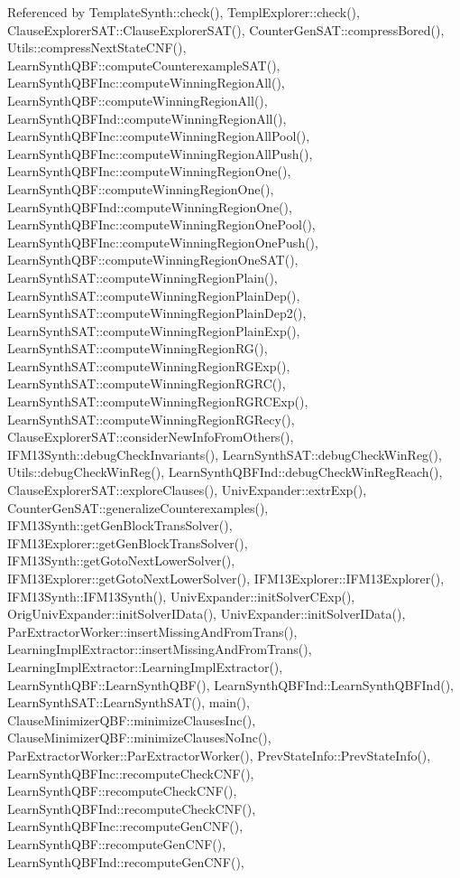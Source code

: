 Referenced by Template\-Synth\-::check(), Templ\-Explorer\-::check(), Clause\-Explorer\-S\-A\-T\-::\-Clause\-Explorer\-S\-A\-T(), Counter\-Gen\-S\-A\-T\-::compress\-Bored(), Utils\-::compress\-Next\-State\-C\-N\-F(), Learn\-Synth\-Q\-B\-F\-::compute\-Counterexample\-S\-A\-T(), Learn\-Synth\-Q\-B\-F\-Inc\-::compute\-Winning\-Region\-All(), Learn\-Synth\-Q\-B\-F\-::compute\-Winning\-Region\-All(), Learn\-Synth\-Q\-B\-F\-Ind\-::compute\-Winning\-Region\-All(), Learn\-Synth\-Q\-B\-F\-Inc\-::compute\-Winning\-Region\-All\-Pool(), Learn\-Synth\-Q\-B\-F\-Inc\-::compute\-Winning\-Region\-All\-Push(), Learn\-Synth\-Q\-B\-F\-Inc\-::compute\-Winning\-Region\-One(), Learn\-Synth\-Q\-B\-F\-::compute\-Winning\-Region\-One(), Learn\-Synth\-Q\-B\-F\-Ind\-::compute\-Winning\-Region\-One(), Learn\-Synth\-Q\-B\-F\-Inc\-::compute\-Winning\-Region\-One\-Pool(), Learn\-Synth\-Q\-B\-F\-Inc\-::compute\-Winning\-Region\-One\-Push(), Learn\-Synth\-Q\-B\-F\-::compute\-Winning\-Region\-One\-S\-A\-T(), Learn\-Synth\-S\-A\-T\-::compute\-Winning\-Region\-Plain(), Learn\-Synth\-S\-A\-T\-::compute\-Winning\-Region\-Plain\-Dep(), Learn\-Synth\-S\-A\-T\-::compute\-Winning\-Region\-Plain\-Dep2(), Learn\-Synth\-S\-A\-T\-::compute\-Winning\-Region\-Plain\-Exp(), Learn\-Synth\-S\-A\-T\-::compute\-Winning\-Region\-R\-G(), Learn\-Synth\-S\-A\-T\-::compute\-Winning\-Region\-R\-G\-Exp(), Learn\-Synth\-S\-A\-T\-::compute\-Winning\-Region\-R\-G\-R\-C(), Learn\-Synth\-S\-A\-T\-::compute\-Winning\-Region\-R\-G\-R\-C\-Exp(), Learn\-Synth\-S\-A\-T\-::compute\-Winning\-Region\-R\-G\-Recy(), Clause\-Explorer\-S\-A\-T\-::consider\-New\-Info\-From\-Others(), I\-F\-M13\-Synth\-::debug\-Check\-Invariants(), Learn\-Synth\-S\-A\-T\-::debug\-Check\-Win\-Reg(), Utils\-::debug\-Check\-Win\-Reg(), Learn\-Synth\-Q\-B\-F\-Ind\-::debug\-Check\-Win\-Reg\-Reach(), Clause\-Explorer\-S\-A\-T\-::explore\-Clauses(), Univ\-Expander\-::extr\-Exp(), Counter\-Gen\-S\-A\-T\-::generalize\-Counterexamples(), I\-F\-M13\-Synth\-::get\-Gen\-Block\-Trans\-Solver(), I\-F\-M13\-Explorer\-::get\-Gen\-Block\-Trans\-Solver(), I\-F\-M13\-Synth\-::get\-Goto\-Next\-Lower\-Solver(), I\-F\-M13\-Explorer\-::get\-Goto\-Next\-Lower\-Solver(), I\-F\-M13\-Explorer\-::\-I\-F\-M13\-Explorer(), I\-F\-M13\-Synth\-::\-I\-F\-M13\-Synth(), Univ\-Expander\-::init\-Solver\-C\-Exp(), Orig\-Univ\-Expander\-::init\-Solver\-I\-Data(), Univ\-Expander\-::init\-Solver\-I\-Data(), Par\-Extractor\-Worker\-::insert\-Missing\-And\-From\-Trans(), Learning\-Impl\-Extractor\-::insert\-Missing\-And\-From\-Trans(), Learning\-Impl\-Extractor\-::\-Learning\-Impl\-Extractor(), Learn\-Synth\-Q\-B\-F\-::\-Learn\-Synth\-Q\-B\-F(), Learn\-Synth\-Q\-B\-F\-Ind\-::\-Learn\-Synth\-Q\-B\-F\-Ind(), Learn\-Synth\-S\-A\-T\-::\-Learn\-Synth\-S\-A\-T(), main(), Clause\-Minimizer\-Q\-B\-F\-::minimize\-Clauses\-Inc(), Clause\-Minimizer\-Q\-B\-F\-::minimize\-Clauses\-No\-Inc(), Par\-Extractor\-Worker\-::\-Par\-Extractor\-Worker(), Prev\-State\-Info\-::\-Prev\-State\-Info(), Learn\-Synth\-Q\-B\-F\-Inc\-::recompute\-Check\-C\-N\-F(), Learn\-Synth\-Q\-B\-F\-::recompute\-Check\-C\-N\-F(), Learn\-Synth\-Q\-B\-F\-Ind\-::recompute\-Check\-C\-N\-F(), Learn\-Synth\-Q\-B\-F\-Inc\-::recompute\-Gen\-C\-N\-F(), Learn\-Synth\-Q\-B\-F\-::recompute\-Gen\-C\-N\-F(), Learn\-Synth\-Q\-B\-F\-Ind\-::recompute\-Gen\-C\-N\-F(), 